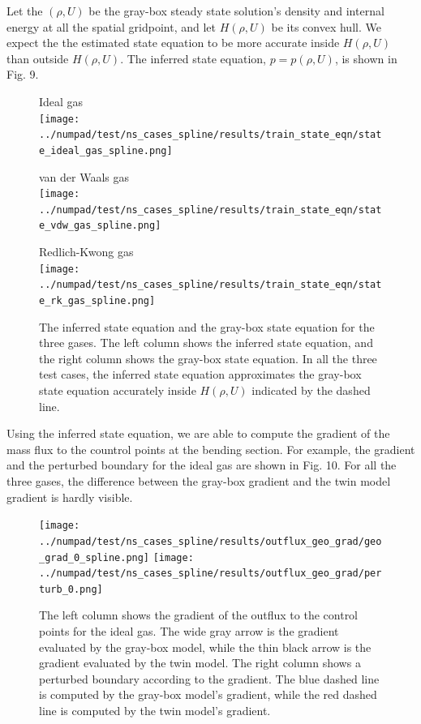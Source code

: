 \documentclass[a4paper,onecolumn]{article}
\theoremstyle{remark}
\begin{document}
\indent Let the $(\rho, U)$ be the gray-box steady state solution's 
density and internal energy at all the spatial
gridpoint, and let $H(\rho, U)$ be its convex hull. We expect the the estimated state equation
to be more accurate inside $H(\rho, U)$ than outside $H(\rho, U)$.
The inferred state equation, $p = p(\rho, U)$, is shown in Fig. 9.
\begin{figure}[H]\begin{center}
    \centering Ideal gas\\
    \texttt{[image: ../numpad/test/ns\_cases\_spline/results/train\_state\_eqn/state\_ideal\_gas\_spline.png]}
\end{center}\end{figure}
\begin{figure}[H]\begin{center}
    \centering van der Waals gas\\
    \texttt{[image: ../numpad/test/ns\_cases\_spline/results/train\_state\_eqn/state\_vdw\_gas\_spline.png]}
\end{center}\end{figure}
\begin{figure}[H]\begin{center}
    \centering Redlich-Kwong gas\\
    \texttt{[image: ../numpad/test/ns\_cases\_spline/results/train\_state\_eqn/state\_rk\_gas\_spline.png]}
    \caption{The inferred state equation and the gray-box state equation for the three gases. 
    The left column shows the inferred state equation, and the right column shows the 
    gray-box state equation.
    In all the three test cases, the inferred state equation approximates the gray-box state
    equation accurately inside $H(\rho, U)$ indicated by the dashed line.}
    \label{fig:NS state eqn}
\end{center}\end{figure}

\indent Using the inferred state equation, we are able to compute the
gradient of the mass flux to the countrol points at the bending section.
For example, the gradient and the perturbed boundary for the ideal gas are shown in Fig. 10.
For all the three gases, the difference between the gray-box gradient and the
twin model gradient is hardly visible.\\ 
\begin{figure}[H]\begin{center}
    \texttt{[image: ../numpad/test/ns\_cases\_spline/results/outflux\_geo\_grad/geo\_grad\_0\_spline.png]}
    \texttt{[image: ../numpad/test/ns\_cases\_spline/results/outflux\_geo\_grad/perturb\_0.png]}
    \caption{The left column shows the gradient of the outflux to the control points for the 
    ideal gas. 
    The wide gray arrow is the gradient evaluated by the gray-box model, while
    the thin black arrow is the gradient evaluated by the twin model.
    The right column shows a perturbed boundary according to the gradient. 
    The blue dashed line is computed by the gray-box model's gradient, while the
    red dashed line is computed by the twin model's gradient.}
\end{center}\end{figure}
\end{document}
